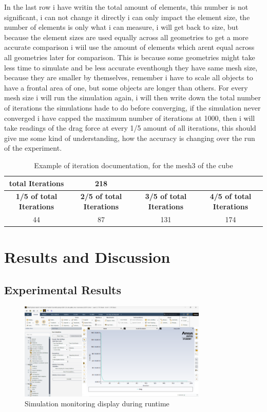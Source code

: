 \documentclass[12pt,a4paper]{article}
\begin{document}
In the last row i have writin the total amount of elements, this number is not significant, i can not change it directly i can only impact the element size, the number of elements is only what i can measure, i will get back to size, but because the element sizes are used equally across all geometries to get a more accurate comparison i wiil use the amount of elements which arent equal across all geometries later for comparison. This is because some geometries might take less time to simulate and be less accurate eventhough they have same mesh size, because they are smaller by themselves, remember i have to scale all objects to have a frontal area of one, but some objects are longer than others. For every mesh size i will run the simulation again, i will then write down the total number of iterations the simulations hade to do before converging, if the simulation never converged i have capped the maximum number of iterations at 1000, then i will take readings of the drag force at every 1/5 amount of all iterations, this should give me some kind of understanding, how the accuracy is changing over the run of the experiment.

\begin{table}[H]
\centering
\caption{Example of iteration documentation, for the mesh3 of the cube}
\label{tab:iteration_example}
\begin{tabular}{|c|c|c|c|}
\hline
\rowcolor{red!50}
\textbf{total Iterations} & \textbf{218} &  &  \\
\hline
\textbf{1/5 of total Iterations} & \textbf{2/5 of total Iterations} & \textbf{3/5 of total Iterations} & \textbf{4/5 of total Iterations} \\
\hline
44 & 87 & 131 & 174 \\
\hline
\end{tabular}
\end{table}
\section{Results and Discussion}

\subsection{Experimental Results}

\begin{figure}[H]
    \centering
    \includegraphics[width=0.8\textwidth]{image8.png}
    \caption{Simulation monitoring display during runtime}
    \label{fig:simulation_display}
\end{figure}
\end{document}
